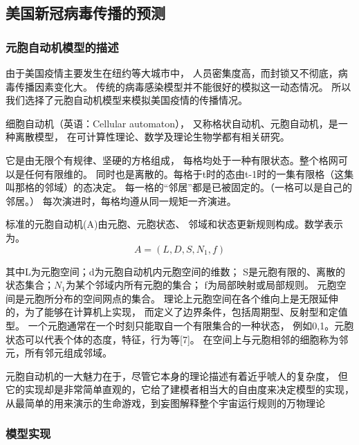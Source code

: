 \documentclass[UTF8]{ctexart}
\begin{document}
\subsection{美国新冠病毒传播的预测}


\subsubsection{元胞自动机模型的描述}
\par
由于美国疫情主要发生在纽约等大城市中，
人员密集度高，而封锁又不彻底，病毒传播因素变化大。
传统的病毒感染模型并不能很好的模拟这一动态情况。
所以我们选择了元胞自动机模型来模拟美国疫情的传播情况。
\\

    \par
细胞自动机（英语：Cellular automaton），
又称格状自动机、元胞自动机，是一种离散模型，
在可计算性理论、数学及理论生物学都有相关研究。
\par 
它是由无限个有规律、坚硬的方格组成，
每格均处于一种有限状态。整个格网可以是任何有限维的。
同时也是离散的。每格于t时的态由t-1时的一集有限格（这集叫那格的邻域）的态决定。
每一格的“邻居”都是已被固定的。（一格可以是自己的邻居。）
每次演进时，每格均遵从同一规矩一齐演进。\cite{bib4}\\
\par 
标准的元胞自动机(A)由元胞、元胞状态、
邻域和状态更新规则构成。数学表示为\cite{bib5}。
$$A=(L,D,S,N_1,f)$$
\par 
其中L为元胞空间；d为元胞自动机内元胞空间的维数；
S是元胞有限的、离散的状态集合；$N_1$为某个邻域内所有元胞的集合；
f为局部映射或局部规则。
元胞空间是元胞所分布的空间网点的集合。
理论上元胞空间在各个维向上是无限延伸的，为了能够在计算机上实现，
而定义了边界条件，包括周期型、反射型和定值型\cite{bib6}。
一个元胞通常在一个时刻只能取自一个有限集合的一种状态，
例如{0,1}。元胞状态可以代表个体的态度，特征，行为等[7]。
在空间上与元胞相邻的细胞称为邻元，所有邻元组成邻域。
\\
\par
元胞自动机的一大魅力在于，尽管它本身的理论描述有着近乎唬人的复杂度，
但它的实现却是非常简单直观的，它给了建模者相当大的自由度来决定模型的实现，从最简单的用来演示的生命游戏，到妄图解释整个宇宙运行规则的万物理论\cite{wol}
\\
\par


\subsubsection{模型实现}
\end{document}
